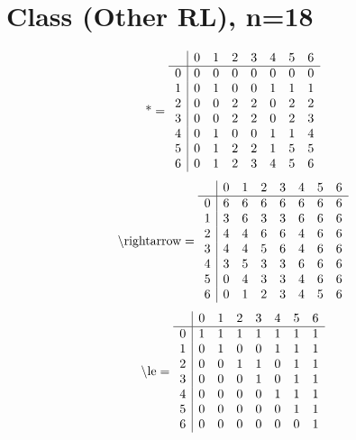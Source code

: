 \documentclass[11pt]{article}
\begin{document}
\section{Class (Other RL), n=18}
\[\text{*} = 
\begin{array}{r | r r r r r r r}
 & 0 & 1 & 2 & 3 & 4 & 5 & 6 \\ \hline
0 & 0 & 0 & 0 & 0 & 0 & 0 & 0 \\
1 & 0 & 1 & 0 & 0 & 1 & 1 & 1 \\
2 & 0 & 0 & 2 & 2 & 0 & 2 & 2 \\
3 & 0 & 0 & 2 & 2 & 0 & 2 & 3 \\
4 & 0 & 1 & 0 & 0 & 1 & 1 & 4 \\
5 & 0 & 1 & 2 & 2 & 1 & 5 & 5 \\
6 & 0 & 1 & 2 & 3 & 4 & 5 & 6 \\
\end{array}
\]
\[\text{\textbackslash rightarrow} = 
\begin{array}{r | r r r r r r r}
 & 0 & 1 & 2 & 3 & 4 & 5 & 6 \\ \hline
0 & 6 & 6 & 6 & 6 & 6 & 6 & 6 \\
1 & 3 & 6 & 3 & 3 & 6 & 6 & 6 \\
2 & 4 & 4 & 6 & 6 & 4 & 6 & 6 \\
3 & 4 & 4 & 5 & 6 & 4 & 6 & 6 \\
4 & 3 & 5 & 3 & 3 & 6 & 6 & 6 \\
5 & 0 & 4 & 3 & 3 & 4 & 6 & 6 \\
6 & 0 & 1 & 2 & 3 & 4 & 5 & 6 \\
\end{array}
\]
\[\text{\textbackslash le} = 
\begin{array}{r | r r r r r r r}
 & 0 & 1 & 2 & 3 & 4 & 5 & 6 \\ \hline
0 & 1 & 1 & 1 & 1 & 1 & 1 & 1 \\
1 & 0 & 1 & 0 & 0 & 1 & 1 & 1 \\
2 & 0 & 0 & 1 & 1 & 0 & 1 & 1 \\
3 & 0 & 0 & 0 & 1 & 0 & 1 & 1 \\
4 & 0 & 0 & 0 & 0 & 1 & 1 & 1 \\
5 & 0 & 0 & 0 & 0 & 0 & 1 & 1 \\
6 & 0 & 0 & 0 & 0 & 0 & 0 & 1 \\
\end{array}
\]
\end{document}
